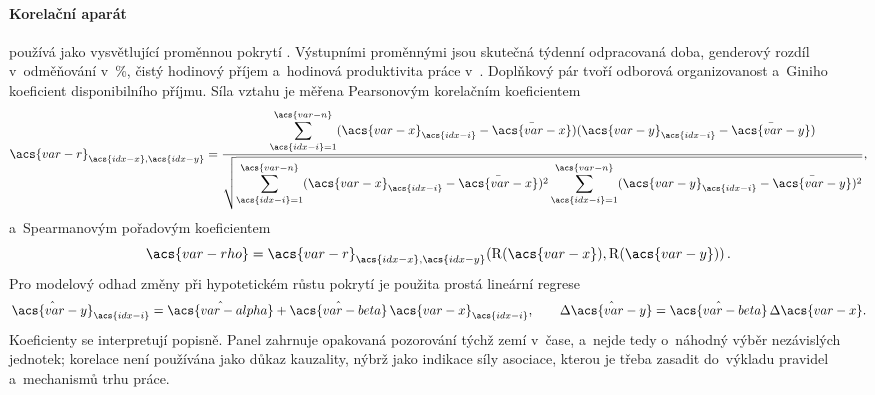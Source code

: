 \paragraph{Korelační aparát}\label{par:korelace_math} používá jako vysvětlující proměnnou pokrytí . Výstupními
proměnnými jsou skutečná týdenní odpracovaná doba, genderový rozdíl v~odměňování v~\%,
čistý hodinový příjem a~hodinová produktivita práce v~. Doplňkový
pár tvoří odborová organizovanost a~Giniho koeficient disponibilního příjmu.
Síla vztahu je měřena Pearsonovým korelačním koeficientem
\begin{equation}
  \acs{var-r}_{\acs{idx-x},\acs{idx-y}}
  = \frac{\displaystyle\sum_{\acs{idx-i}=1}^{\acs{var-n}}
            (\acs{var-x}_{\acs{idx-i}} - \bar{\acs{var-x}})
            (\acs{var-y}_{\acs{idx-i}} - \bar{\acs{var-y}})}
         {\displaystyle\sqrt{
            \sum_{\acs{idx-i}=1}^{\acs{var-n}}(\acs{var-x}_{\acs{idx-i}}-\bar{\acs{var-x}})^2
            \sum_{\acs{idx-i}=1}^{\acs{var-n}}(\acs{var-y}_{\acs{idx-i}}-\bar{\acs{var-y}})^2}},
  \label{eq:pearson_r}
\end{equation}
a~Spearmanovým pořadovým koeficientem
\begin{equation}
  \acs{var-rho} = \acs{var-r}_{\acs{idx-x},\acs{idx-y}}\!\left(\operatorname{R}(\acs{var-x}),\operatorname{R}(\acs{var-y})\right).
  \label{eq:spearman_rho}
\end{equation}
Pro modelový odhad změny při hypotetickém růstu pokrytí  je použita
prostá lineární regrese
\begin{equation}
  \hat{\acs{var-y}}_{\acs{idx-i}} = \hat{\acs{var-alpha}} + \hat{\acs{var-beta}}\,\acs{var-x}_{\acs{idx-i}},
  \qquad
  \Delta\hat{\acs{var-y}} = \hat{\acs{var-beta}}\,\Delta \acs{var-x}.
  \label{eq:ols}
\end{equation}
Koeficienty se interpretují popisně. Panel zahrnuje opakovaná pozorování týchž
zemí v~čase, a~nejde tedy o~náhodný výběr nezávislých jednotek; korelace
není používána jako důkaz kauzality, nýbrž jako indikace síly asociace,
kterou je třeba zasadit do~výkladu pravidel a~mechanismů trhu práce.\par
